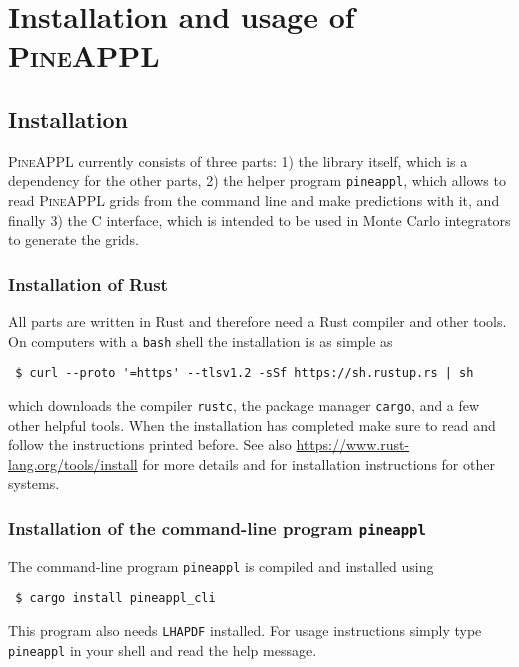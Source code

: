 \section{Installation and usage of \texorpdfstring{\textsc{PineAPPL}}{PineAPPL}}
\label{app:pineappl}

\subsection{Installation}
\label{app:installation}

\textsc{PineAPPL} currently consists of three parts: 1) the library itself, which is a dependency for the other parts, 2) the helper program \texttt{pineappl}, which allows to read \textsc{PineAPPL} grids from the command line and make predictions with it, and finally 3) the C interface, which is intended to be used in Monte Carlo integrators to generate the grids.

\subsubsection*{Installation of Rust}


All parts are written in Rust and therefore need a Rust compiler and other tools.
On computers with a \texttt{bash} shell the installation is as simple as
\begin{verbatim}
 $ curl --proto '=https' --tlsv1.2 -sSf https://sh.rustup.rs | sh
\end{verbatim}
which downloads the compiler \texttt{rustc}, the package manager \texttt{cargo}, and a few other helpful tools.
When the installation has completed make sure to read and follow the instructions printed before.
See also \url{https://www.rust-lang.org/tools/install} for more details and for installation instructions for other systems.

\subsubsection*{Installation of the command-line program \texorpdfstring{\texttt{pineappl}}{pineappl}}

The command-line program \texttt{pineappl} is compiled and installed using
\begin{verbatim}
 $ cargo install pineappl_cli
\end{verbatim}
This program also needs \texttt{LHAPDF} \cite{Buckley:2014ana} installed.
For usage instructions simply type \texttt{pineappl} in your shell and read the help message.

